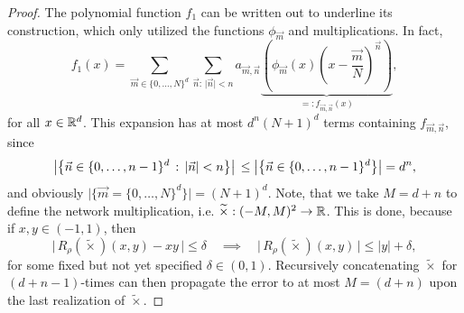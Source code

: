 \begin{proof}
    The polynomial function $f_1$ can be written out to underline its construction, which only utilized 
    the functions $\phi_{\vec{m}}$ and multiplications. In fact, 
    \begin{equation} \label{eq: yarotsky f_1 def}
        f_1(x) = \sum_{\vec{m} \in \{0, \dots, N\}^d} \sum_{\vec{n}: \, \vert \vec{n} \vert < n} a_{\vec{m}, \vec{n}} 
        \underbrace{\left( \phi_{\vec{m}}(x) \left(x - \frac{\vec{m}}{N}\right)^{\vec{n}} \right)}_{=: f_{\vec{m}, \vec{n}}(x)},
    \end{equation}
    for all $x \in \mathbb{R}^d$.
    This expansion has at most $d^n (N + 1)^d$ terms containing $f_{\vec{m}, \vec{n}}$, since 
    \begin{equation*}
        \left\vert\left\{ \vec{n} \in \{0, \dots, n - 1\}^d \, : \, \vert \vec{n} \vert < n\right\}\right\vert \\
        \leq \left\vert\left\{ \vec{n} \in \{0, \dots, n - 1\}^d \right\}\right\vert = d^n,
    \end{equation*}
    and obviously $\vert\{\vec{m} = \{0, \dots, N\}^d \}\vert = (N + 1)^d$. Note, that we take $M = d + n$ to define 
    the network multiplication, i.e. $\widetilde{\times}: (-M, M)^2 \to \mathbb{R}$. This is done, because 
    if $x, y \in (-1, 1)$, then
    \begin{equation*}
        \vert \, R_\rho(\tilde{\times})(x, y) - x y \, \vert \leq \delta \quad
        \implies \quad
        \vert \, R_\rho(\tilde{\times})(x, y)\, \vert \leq \vert y \vert + \delta,
    \end{equation*}
    for some fixed but not yet specified $\delta \in (0,1)$. Recursively concatenating 
    $\tilde{\times}$ for $(d + n - 1)$-times can then propagate the error to at most $M = (d + n)$ 
    upon the last realization of $\tilde{\times}$.
    

\end{proof}
